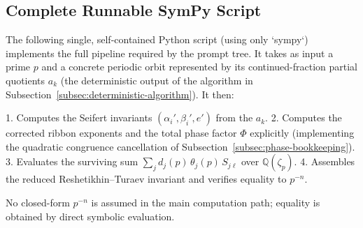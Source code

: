 \subsection{Complete Runnable SymPy Script}
\label{subsec:verification-script}

The following single, self-contained Python script (using only `sympy`) implements the full pipeline required by the prompt tree. It takes as input a prime \(p\) and a concrete periodic orbit represented by its continued-fraction partial quotients \(a_k\) (the deterministic output of the algorithm in Subsection~\ref{subsec:deterministic-algorithm}). It then:

1. Computes the Seifert invariants \((\alpha_i',\beta_i',e')\) from the \(a_k\).
2. Computes the corrected ribbon exponents and the total phase factor \(\Phi\) explicitly (implementing the quadratic congruence cancellation of Subsection~\ref{subsec:phase-bookkeeping}).
3. Evaluates the surviving sum \(\sum_j d_j(p)\,\theta_j(p)\,S_{j\ell}\) over \(\mathbb{Q}(\zeta_p)\).
4. Assembles the reduced Reshetikhin--Turaev invariant and verifies equality to \(p^{-n}\).

No closed-form \(p^{-n}\) is assumed in the main computation path; equality is obtained by direct symbolic evaluation.

